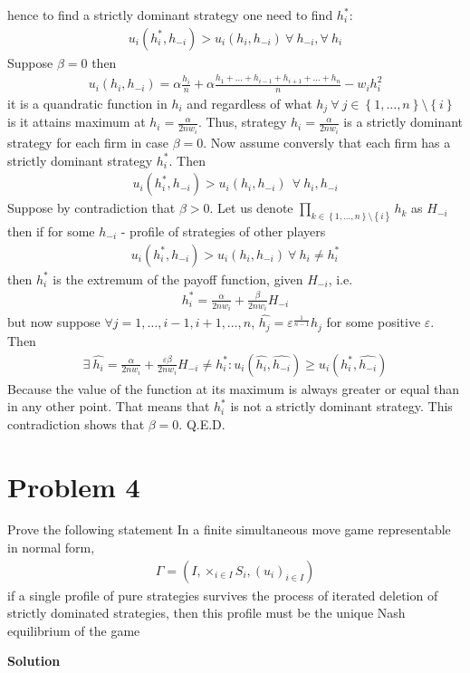 \documentclass[a4paper]{article}
\begin{document}
hence to find a strictly dominant strategy one need to find $h_i^*$:
\begin{align*}
u_i(h_i^*, h_{-i}) > u_i(h_i, h_{-i})\ \forall\ h_{-i}, \forall\ h_i
\end{align*}
Suppose $\beta = 0$ then 
\begin{align*}
u_i(h_i, h_{-i}) = \alpha\frac{h_i}{n} + \alpha\frac{h_1 + \dots+h_{i-1}+h_{i+1}+\dots+h_n}{n} - w_ih_i^2
\end{align*}
it is a quandratic function in $h_i$ and regardless of what $h_j\ \forall\ j \in\left\{1, \dots, n\right\}\setminus \left\{i\right\}$ is it attains maximum at $h_i = \frac{\alpha}{2nw_i}$. Thus, strategy $h_i = \frac{\alpha}{2nw_i}$ is a strictly dominant strategy for each firm in case $\beta = 0$. Now assume conversly that each firm has a strictly dominant strategy $h_i^*$. Then 
\begin{align*}
u_i(h_i^*, h_{-i}) > u_i(h_i, h_{-i})\ \  \forall\ h_i, h_{-i}
\end{align*}
Suppose by contradiction that $\beta > 0$. Let us denote $\prod_{k \in \left\{1, \dots, n\right\}\setminus\left\{i\right\}}h_k$ as $H_{-i}$ then if for some $h_{-i}$ - profile of strategies of other players
\begin{align*}
u_i(h_i^*, h_{-i}) > u_i(h_i, h_{-i})\ \forall\ h_i \neq h_{i}^*
\end{align*}
then $h_{i}^*$ is the extremum of the payoff function, given $H_{-i}$, i.e.
\begin{align*}
h_i^* = \frac{\alpha}{2nw_i} + \frac{\beta}{2nw_i}H_{-i}
\end{align*}
but now suppose $\forall j = 1, \dots, i-1, i+1, \dots, n$, $\hat{h_j} = \varepsilon^{\frac{1}{n-1}}h_j$ for some positive $\varepsilon$. Then
\begin{align*}
\exists\ \hat{h_i} = \frac{\alpha}{2nw_i} + \frac{\varepsilon \beta}{2nw_i}H_{-i} \neq h^*_i: u_i(\hat{h_i}, \hat{h_{-i}}) \ge u_i(h_i^*, \hat{h_{-i}})
\end{align*}
Because the value of the function at its maximum is always greater or equal than in any other point. That means that $h_i^*$ is not a strictly dominant strategy. This contradiction shows that $\beta = 0$. Q.E.D.
\section*{Problem 4}
Prove the following statement
In a finite simultaneous move game representable in normal form,
\begin{align*}
\Gamma =
(I, \times_{i \in I}S_i,(u_i)_{i\in I})
\end{align*}
if a single profile of pure strategies survives the process of iterated deletion
of strictly dominated strategies, then this profile must be the unique Nash
equilibrium of the game


\textbf{Solution}
\end{document}
